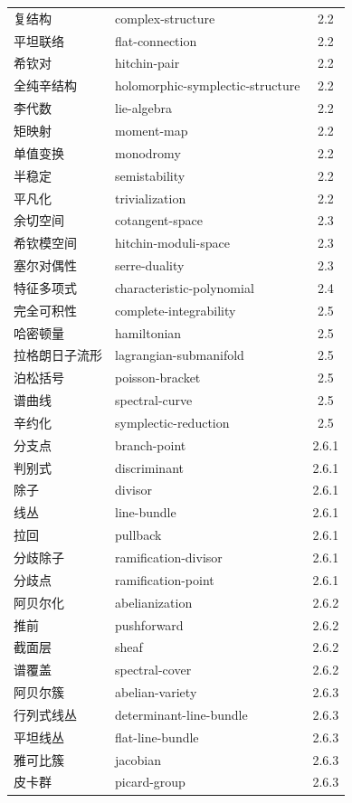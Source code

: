 \begin{longtable}{p{}p{}c}
复结构 & complex-structure & 2.2\\
平坦联络 & flat-connection & 2.2\\
希钦对 & hitchin-pair & 2.2\\
全纯辛结构 & holomorphic-symplectic-structure & 2.2\\
李代数 & lie-algebra & 2.2\\
矩映射 & moment-map & 2.2\\
单值变换 & monodromy & 2.2\\
半稳定 & semistability & 2.2\\
平凡化 & trivialization & 2.2\\
余切空间 & cotangent-space & 2.3\\
希钦模空间 & hitchin-moduli-space & 2.3\\
塞尔对偶性 & serre-duality & 2.3\\
特征多项式 & characteristic-polynomial & 2.4\\
完全可积性 & complete-integrability & 2.5\\
哈密顿量 & hamiltonian & 2.5\\
拉格朗日子流形 & lagrangian-submanifold & 2.5\\
泊松括号 & poisson-bracket & 2.5\\
谱曲线 & spectral-curve & 2.5\\
辛约化 & symplectic-reduction & 2.5\\
分支点 & branch-point & 2.6.1\\
判别式 & discriminant & 2.6.1\\
除子 & divisor & 2.6.1\\
线丛 & line-bundle & 2.6.1\\
拉回 & pullback & 2.6.1\\
分歧除子 & ramification-divisor & 2.6.1\\
分歧点 & ramification-point & 2.6.1\\
阿贝尔化 & abelianization & 2.6.2\\
推前 & pushforward & 2.6.2\\
截面层 & sheaf & 2.6.2\\
谱覆盖 & spectral-cover & 2.6.2\\
阿贝尔簇 & abelian-variety & 2.6.3\\
行列式线丛 & determinant-line-bundle & 2.6.3\\
平坦线丛 & flat-line-bundle & 2.6.3\\
雅可比簇 & jacobian & 2.6.3\\
皮卡群 & picard-group & 2.6.3\\

\end{longtable}
